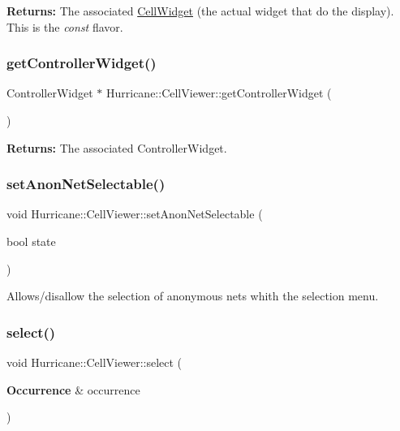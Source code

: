 {\bfseries Returns\+:} The associated \mbox{\hyperlink{classHurricane_1_1CellWidget}{Cell\+Widget}} (the actual widget that do the display). This is the {\itshape const} flavor. \mbox{\label{classHurricane_1_1CellViewer_a153855cfa6baa5d50bf0339820c4f145}} 
\subsubsection{\texorpdfstring{get\+Controller\+Widget()}{getControllerWidget()}}
{\footnotesize\ttfamily Controller\+Widget $\ast$ Hurricane\+::\+Cell\+Viewer\+::get\+Controller\+Widget (\begin{DoxyParamCaption}{ }\end{DoxyParamCaption})\hspace{0.3cm}{\ttfamily [inline]}}

{\bfseries Returns\+:} The associated Controller\+Widget. \mbox{\label{classHurricane_1_1CellViewer_a7e4c9aaf405e4895e1527515dff3f067}} 
\subsubsection{\texorpdfstring{set\+Anon\+Net\+Selectable()}{setAnonNetSelectable()}}
{\footnotesize\ttfamily void Hurricane\+::\+Cell\+Viewer\+::set\+Anon\+Net\+Selectable (\begin{DoxyParamCaption}\item[{bool}]{state }\end{DoxyParamCaption})}

Allows/disallow the selection of anonymous nets whith the selection menu. \mbox{\label{classHurricane_1_1CellViewer_a9f5b6c901e01c53c66cbd0f347cb10be}} 
\subsubsection{\texorpdfstring{select()}{select()}}
{\footnotesize\ttfamily void Hurricane\+::\+Cell\+Viewer\+::select (\begin{DoxyParamCaption}\item[{\textbf{ Occurrence} \&}]{occurrence }\end{DoxyParamCaption})}

